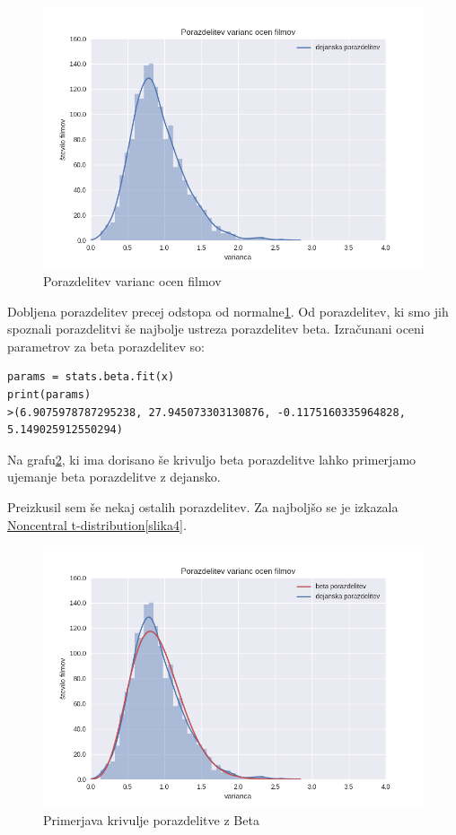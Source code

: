 \documentclass[a4paper,11pt]{article}
\begin{document}
\begin{figure}[htbp]
\begin{center}
\includegraphics[scale=0.7]{porazdelitev.png}
\caption{Porazdelitev varianc ocen filmov}
\label{slika2}
\end{center}
\end{figure}

Dobljena porazdelitev precej odstopa od normalne\ref{slika2}. Od porazdelitev, ki smo jih spoznali porazdelitvi še najbolje ustreza porazdelitev beta. Izračunani oceni parametrov za beta porazdelitev so:
\begin{lstlisting}
params = stats.beta.fit(x)
print(params)
>(6.9075978787295238, 27.945073303130876, -0.1175160335964828, 5.149025912550294)
\end{lstlisting}


Na grafu\ref{slika5}, ki ima dorisano še krivuljo beta porazdelitve lahko primerjamo ujemanje beta porazdelitve z dejansko.

Preizkusil sem še nekaj ostalih porazdelitev. Za najboljšo se je izkazala \href{https://en.wikipedia.org/wiki/Noncentral_t-distribution}{Noncentral t-distribution}\ref{slika4}. 


\begin{figure}[htbp]
\begin{center}
\includegraphics[scale=0.7]{porazdelitevBeta.png}
\caption{Primerjava krivulje porazdelitve z Beta}
\label{slika5}
\end{center}
\end{figure}
\end{document}
